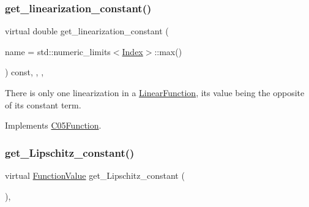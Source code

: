 \subsubsection{\texorpdfstring{get\+\_\+linearization\+\_\+constant()}{get\_linearization\_constant()}}
{\footnotesize\ttfamily virtual double get\+\_\+linearization\+\_\+constant (\begin{DoxyParamCaption}\item[{const \mbox{\hyperlink{class_s_m_spp__di__unipi__it_1_1_c05_function_ae90bf93c6d4b4ada66791c735d1c03cc}{Linearization\+Name}}}]{name = {\ttfamily std\+:\+:numeric\+\_\+limits$<$\mbox{\hyperlink{group___thin_var_dep_interface___c_l_a_s_s_e_s_gad53d6229d7ec28555a9c9c2fd9abf773}{Index}}$>$\+:\+:max()} }\end{DoxyParamCaption}) const\hspace{0.3cm}{\ttfamily [inline]}, {\ttfamily [final]}, {\ttfamily [override]}, {\ttfamily [virtual]}}

There is only one linearization in a \mbox{\hyperlink{class_s_m_spp__di__unipi__it_1_1_linear_function}{Linear\+Function}}, its value being the opposite of its constant term. 

Implements \mbox{\hyperlink{class_s_m_spp__di__unipi__it_1_1_c05_function_a3dd9dea6fa3125e0c45acb5fc28955f8}{C05\+Function}}.

\mbox{\label{class_s_m_spp__di__unipi__it_1_1_linear_function_a4f76a73bde6d436526ea03959f886105}} 
\subsubsection{\texorpdfstring{get\+\_\+\+Lipschitz\+\_\+constant()}{get\_Lipschitz\_constant()}}
{\footnotesize\ttfamily virtual \mbox{\hyperlink{class_s_m_spp__di__unipi__it_1_1_function_a9ad432406b609e28d340f73e9474bffe}{Function\+Value}} get\+\_\+\+Lipschitz\+\_\+constant (\begin{DoxyParamCaption}\item[{void}]{ }\end{DoxyParamCaption})\hspace{0.3cm}{\ttfamily [override]}, {\ttfamily [virtual]}}



